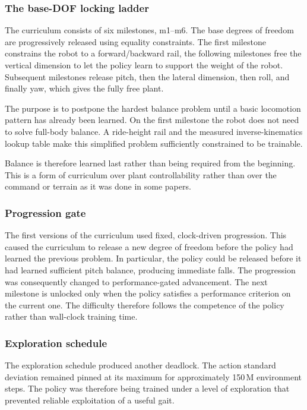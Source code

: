 \subsubsection{The base-DOF locking ladder}

The curriculum consists of six milestones, m1--m6.
The base degrees of freedom are progressively released using equality constraints.
The first milestone constrains the robot to a forward/backward rail, the following milestones free the vertical dimension to let the policy learn to support the weight of the robot.
Subsequent milestones release pitch, then the lateral dimension, then roll, and finally yaw, which gives the fully free plant.

The purpose is to postpone the hardest balance problem until a basic locomotion pattern has already been learned.
On the first milestone the robot does not need to solve full-body balance.
A ride-height rail and the measured inverse-kinematics lookup table make this simplified problem sufficiently constrained to be trainable.

Balance is therefore learned last rather than being required from the beginning.
This is a form of curriculum over plant controllability rather than over the command or terrain as it was done in some papers.

\subsubsection{Progression gate}

The first versions of the curriculum used fixed, clock-driven progression.
This caused the curriculum to release a new degree of freedom before the policy had learned the previous problem.
In particular, the policy could be released before it had learned sufficient pitch balance, producing immediate falls.
The progression was consequently changed to performance-gated advancement.
The next milestone is unlocked only when the policy satisfies a performance criterion on the current one.
The difficulty therefore follows the competence of the policy rather than wall-clock training time.


\newpage 

\subsubsection{Exploration schedule}

The exploration schedule produced another deadlock.
The action standard deviation remained pinned at its maximum for approximately 150\,M environment steps.
The policy was therefore being trained under a level of exploration that prevented reliable exploitation of a useful gait.

